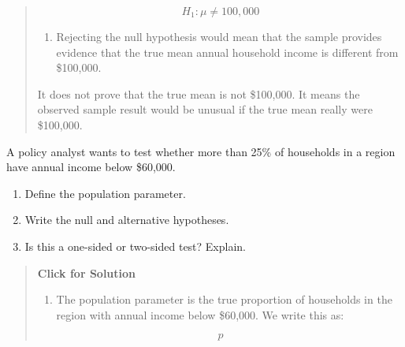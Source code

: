 \documentclass[
  letterpaper,
  DIV=11,
  numbers=noendperiod]{scrreprt}
\providecommand{\tightlist}{%
  \setlength{\itemsep}{0pt}\setlength{\parskip}{0pt}}
\begin{document}
\begin{tcolorbox}
\begin{quote}
\[
H_1: \mu \neq 100{,}000
\]

\begin{enumerate}
\def\labelenumi{\alph{enumi}.}
\setcounter{enumi}{3}
\tightlist
\item
  Rejecting the null hypothesis would mean that the sample provides
  evidence that the true mean annual household income is different from
  \$100,000.
\end{enumerate}

It does not prove that the true mean is not \$100,000. It means the
observed sample result would be unusual if the true mean really were
\$100,000.
\end{quote}

\end{tcolorbox}

\begin{tcolorbox}[enhanced jigsaw, arc=.35mm, bottomrule=.15mm, bottomtitle=1mm, breakable, colback=white, colbacktitle=quarto-callout-note-color!10!white, colframe=quarto-callout-note-color-frame, coltitle=black, left=2mm, leftrule=.75mm, opacityback=0, opacitybacktitle=0.6, rightrule=.15mm, title=\textcolor{quarto-callout-note-color}{\faInfo}\hspace{0.5em}{Question 2}, titlerule=0mm, toprule=.15mm, toptitle=1mm]

A policy analyst wants to test whether more than 25\% of households in a
region have annual income below \$60,000.

\begin{enumerate}
\def\labelenumi{\alph{enumi}.}
\tightlist
\item
  Define the population parameter.\\
\item
  Write the null and alternative hypotheses.\\
\item
  Is this a one-sided or two-sided test? Explain.
\end{enumerate}

\begin{quote}
\textbf{Click for Solution}

\begin{enumerate}
\def\labelenumi{\alph{enumi}.}
\tightlist
\item
  The population parameter is the true proportion of households in the
  region with annual income below \$60,000. We write this as:
\end{enumerate}

\[
p
\]


\end{quote}
\end{tcolorbox}
\end{document}

